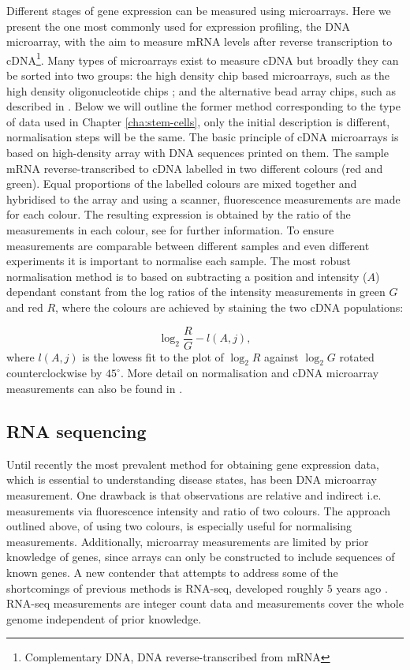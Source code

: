 Different stages of gene expression can be measured using microarrays. Here we present the one most commonly used for expression profiling, the DNA microarray, with the aim  to measure mRNA levels after reverse transcription to cDNA\footnote{Complementary DNA, DNA reverse-transcribed from mRNA}. Many types of microarrays exist to measure cDNA but broadly they can be sorted into two groups: the high density chip based microarrays, such as the high density oligonucleotide chips \citep{Lockhart:1996jw}; and the alternative bead array chips, such as described in \citep{Kuhn:2004gf}. Below we will outline the former method corresponding to the type of data used in Chapter \ref{cha:stem-cells}, only the initial description is different, normalisation steps will be the same. The basic principle of cDNA microarrays is based on high-density array with DNA sequences printed on them. The sample mRNA reverse-transcribed to cDNA labelled in two different colours (red and green). Equal proportions of the labelled colours are mixed together and hybridised to the array and using a scanner, fluorescence measurements are made for each colour. The resulting expression is obtained by the ratio of the measurements in each colour, see \cite{phimister1999chipping} for further information. To ensure measurements are comparable between different samples and even different experiments it is important to normalise each sample. The most robust normalisation method is to based on subtracting a position and intensity ($A$) dependant constant from the log ratios of the intensity measurements in green $G$ and red $R$, where the colours are achieved by staining the two cDNA populations:

\begin{equation}
  \label{eq:microarray-norm}
  \log_2 \frac{R}{G} - l(A, j),
\end{equation}
where $l(A, j)$ is the lowess fit \citep{Cleveland:2012fu} to the plot of $\log_2 R$ against $\log_2 G$ rotated counterclockwise by $45^{\circ}$. More detail on normalisation and cDNA microarray measurements can also be found in \cite{Dudoit:2002va}.

\subsection{RNA sequencing}
\label{sec:rna-sequencing}

Until recently the most prevalent method for obtaining gene expression data, which is essential to understanding disease states, has been DNA microarray measurement. One drawback is that observations are relative and indirect i.e. measurements via fluorescence intensity and ratio of two colours. The approach outlined above, of using two colours, is especially useful for normalising measurements. Additionally, microarray measurements are limited by prior knowledge of genes, since arrays can only be constructed to include sequences of known genes. A new contender that attempts to address some of the shortcomings of previous methods is RNA-seq, developed roughly $5$ years ago \citep{Mortazavi:2008jj, Nagalakshmi:2008cj}. RNA-seq measurements are integer count data and measurements cover the whole genome independent of prior knowledge.

